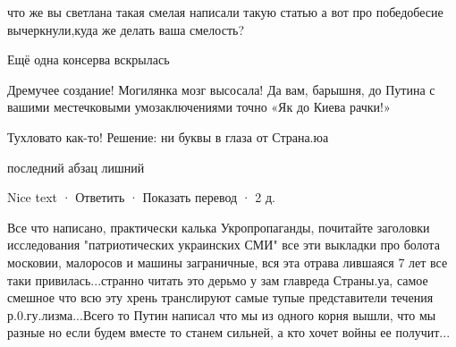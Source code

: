 \begin{itemize}
что же вы светлана такая смелая написали такую статью а вот про победобесие вычеркнули,куда же делать ваша смелость?

 
Ещё одна консерва вскрылась

 
Дремучее создание! Могилянка мозг высосала! Да вам, барышня, до Путина с вашими местечковыми умозаключениями точно «Як до Киева рачки!»

 
Тухловато как-то!
Решение: ни буквы в глаза от Страна.юа

 
последний абзац лишний

 
Nice text
 · Ответить · Показать перевод · 2 д.
 

Все что написано, практически калька Укропропаганды, почитайте заголовки
исследования "патриотических украинских СМИ" все эти выкладки про болота
московии, малоросов и машины заграничные, вся эта отрава лившаяся 7 лет все
таки привилась...странно читать это дерьмо у зам главреда Страны.уа, самое
смешное что всю эту хрень транслируют самые тупые представители течения
р.0.гу.лизма...Всего то Путин написал что мы из одного корня вышли, что мы
разные но если будем вместе то станем сильней, а кто хочет войны ее получит...


\end{itemize}
